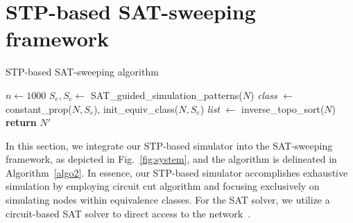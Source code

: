 \documentclass[conference]{IEEEtran}
\begin{document}
\vspace{-2mm}
\section{STP-based SAT-sweeping framework}
\label{sec4}
\begin{algorithm}[t]\footnotesize
  \SetAlgoLined
  \LinesNumbered %
  \caption{STP-based SAT-sweeping algorithm}
  \label{algo2}
  $n \leftarrow 1000$ \;
  $S_e,S_c \leftarrow$ SAT\_guided\_simulation\_patterns($N$)\;
  \emph{class} $\leftarrow$ constant\_prop($N,S_c$), init\_equiv\_class($N,S_e$)\;
  \emph{list}  $\leftarrow$ inverse\_topo\_sort($N$)\;
  \textbf{return} $N'$\;
\end{algorithm}

In this section, we integrate our STP-based simulator into the SAT-sweeping framework, as depicted in Fig.~\ref{fig:system}, and the algorithm is delineated in Algorithm~\ref{algo2}.
In essence, our STP-based simulator accomplishes exhaustive simulation by employing circuit cut algorithm and focusing exclusively on simulating nodes within equivalence classes.
For the SAT solver, we utilize a circuit-based SAT solver to direct access to the network~\cite{sweep3}.
\end{document}
